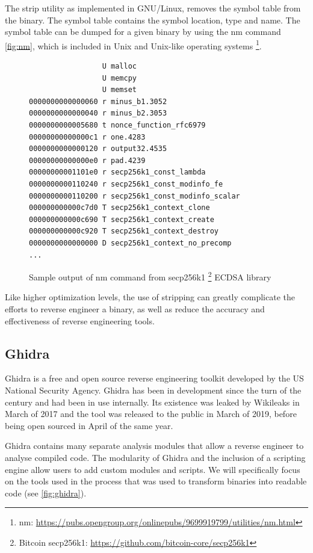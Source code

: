 The strip utility as implemented in GNU/Linux, removes the symbol table from the binary. The symbol table contains the symbol location, type and name. The symbol table can be dumped for a given binary by using the nm command \ref{fig:nm}, which is included in Unix and Unix-like operating systems \footnote{nm: \url{https://pubs.opengroup.org/onlinepubs/9699919799/utilities/nm.html}}. 

\label{fig:nm}
\begin{figure}[!h]
  \centering
\begin{lstlisting}
                 U malloc
                 U memcpy
                 U memset
0000000000000060 r minus_b1.3052
0000000000000040 r minus_b2.3053
0000000000005680 t nonce_function_rfc6979
00000000000000c1 r one.4283
0000000000000120 r output32.4535
00000000000000e0 r pad.4239
00000000001101e0 r secp256k1_const_lambda
0000000000110240 r secp256k1_const_modinfo_fe
0000000000110200 r secp256k1_const_modinfo_scalar
000000000000c7d0 T secp256k1_context_clone
000000000000c690 T secp256k1_context_create
000000000000c920 T secp256k1_context_destroy
0000000000000000 D secp256k1_context_no_precomp
...
\end{lstlisting}
  \caption{Sample output of nm command from secp256k1 \protect\footnote{Bitcoin secp256k1: \protect\url{https://github.com/bitcoin-core/secp256k1}} ECDSA library}
\end{figure}

Like higher optimization levels, the use of stripping can greatly complicate the efforts to reverse engineer a binary, as well as reduce the accuracy and effectiveness of reverse engineering tools. 
\newpage
\subsection{Ghidra}
Ghidra is a free and open source reverse engineering toolkit developed by the US National Security Agency. Ghidra has been in development since the turn of the century and had been in use internally. Its existence was leaked by Wikileaks in March of 2017 and the tool was released to the public in March of 2019, before being open sourced in April of the same year.

Ghidra contains many separate analysis modules that allow a reverse engineer to analyse compiled code. The modularity of Ghidra and the inclusion of a scripting engine allow users to add custom modules and scripts. We will specifically focus on the tools used in the process that was used to transform binaries into readable code (see \ref{fig:ghidra}).

